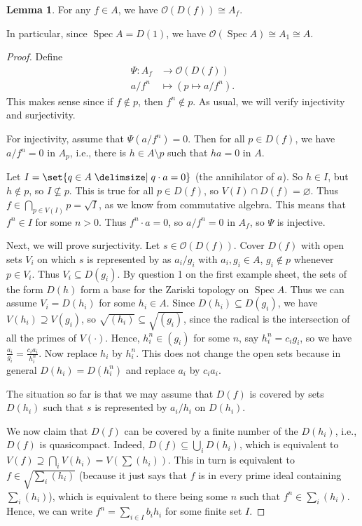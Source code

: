 \documentclass[a4paper]{amsbook}
\theoremstyle{definition}
\newtheorem*{lemma*}{Lemma}
\DeclareMathOperator\Spec{Spec}
\begin{document}
\begin{lemma*}
\label{StructureSheafStandardOpen}
For any $f \in A$, we have $\mathcal{O}(D(f)) \cong A_f$.

In particular, since $\Spec A = D(1)$, we have $\mathcal{O}(\Spec A) \cong A_1 \cong A$.
\end{lemma*}
\begin{proof}[Proof]
Define
\begin{align*}
	\Psi\colon A_f&\to \mathcal{O}(D(f))\\
	a/f^n&\mapsto (p\mapsto a/f^n).
\end{align*}
This makes sense since if $f\notin p$, then $f^n\notin p$.
As usual, we will verify injectivity and surjectivity.

For injectivity, assume that $\Psi(a/f^n) = 0$. Then for all $p \in D(f)$, we have
$a/f^n = 0$ in $A_p$, i.e., there is  $h \in A\setminus p$ such that $ha = 0$ in $A$.

Let $I = \set{q \in A\given q\cdot a = 0}$ (the annihilator of $a$).
So $h \in I$, but $h \notin p$, so $I\nsubseteq p$.
This is true for all $p \in D(f)$, so $V(I)\cap D(f) = \varnothing$. Thus
$f \in \bigcap_{p \in V(I)}p = \sqrt{I}$, as we know from commutative algebra.
This means that $f^n \in I$ for some $n>0$. Thus $f^n\cdot a = 0$, so
$a/f^n = 0$ in $A_f$, so $\Psi$ is injective.

Next, we will prove surjectivity. Let $s \in \mathcal{O}(D(f))$. Cover
$D(f)$ with open sets $V_i$ on which $s$ is represented by as $a_i/g_i$ with
$a_i, g_i \in A$, $g_i \notin p$ whenever $p \in V_i$. Thus $V_i \subseteq D(g_i)$.
By question 1 on the first example sheet, the sets of the form $D(h)$ form a
base for the Zariski topology on $\Spec A$. Thus we can assume $V_i = D(h_i)$
for some $h_i \in A$. Since $D(h_i) \subseteq D(g_i)$, we have
$V(h_i) \supseteq V(g_i)$, so $\sqrt{(h_i)} \subseteq \sqrt{(g_i)}$, since the
radical is the intersection of all the primes of $V(\cdot)$. Hence,
$h_i^n \in (g_i)$ for some $n$, say $h_i^n = c_ig_i$, so we have
$\frac{a_i}{g_i} = \frac{c_ia_i}{h_i^n}$. Now replace $h_i$ by $h_i^n$. This does
not change the open sets because in general $D(h_i) = D(h_i^n)$ and replace
$a_i$ by $c_ia_i$.

The situation so far is that we may assume that $D(f)$ is covered by sets
$D(h_i)$ such that $s$ is represented by $a_i/h_i$ on $D(h_i)$.

We now claim that $D(f)$ can be covered by a finite number of the  $D(h_i)$, i.e.,
$D(f)$ is quasicompact. Indeed, $D(f) \subseteq \bigcup_i D(h_i)$, which is equivalent
to $V(f) \supseteq \bigcap_i V(h_i) = V(\sum (h_i))$. This in turn is equivalent to
$f \in \sqrt{\sum_i (h_i)}$ (because it just says that $f$ is in every prime ideal
containing $\sum_i (h_i)$), which is equivalent to there being some $n$ such that
$f^n \in \sum_i (h_i)$. Hence, we can write $f^n = \sum_{i \in I} b_i h_i$ for some finite
set $I$.


\end{proof}
\end{document}
